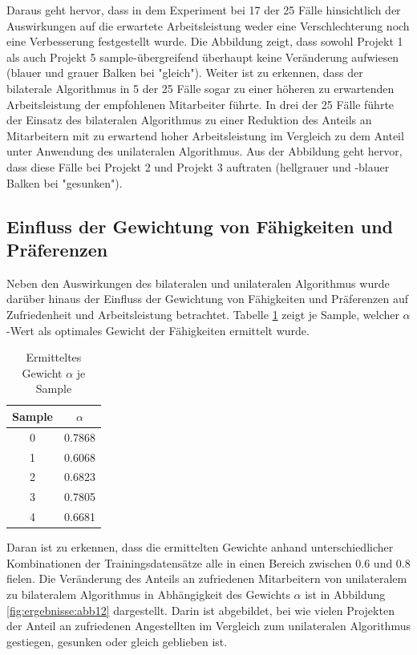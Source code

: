 Daraus geht hervor, dass in dem Experiment bei 17 der 25 Fälle hinsichtlich der Auswirkungen auf die erwartete Arbeitsleistung weder eine Verschlechterung noch eine Verbesserung festgestellt wurde.
Die Abbildung zeigt, dass sowohl Projekt 1 als auch Projekt 5 sample-übergreifend überhaupt keine Veränderung aufwiesen (blauer und grauer Balken bei "gleich").
Weiter ist zu erkennen, dass der bilaterale Algorithmus in 5 der 25 Fälle sogar zu einer höheren zu erwartenden Arbeitsleistung der empfohlenen Mitarbeiter führte. 
In drei der 25 Fälle führte der Einsatz des bilateralen Algorithmus zu einer Reduktion des Anteils an Mitarbeitern mit zu erwartend hoher Arbeitsleistung im Vergleich zu dem Anteil unter Anwendung des unilateralen Algorithmus.
Aus der Abbildung geht hervor, dass diese Fälle bei Projekt 2 und Projekt 3 auftraten (hellgrauer und -blauer Balken bei "gesunken").

\subsection{Einfluss der Gewichtung von Fähigkeiten und Präferenzen}
Neben den Auswirkungen des bilateralen und unilateralen Algorithmus wurde darüber hinaus der Einfluss der Gewichtung von Fähigkeiten und Präferenzen auf Zufriedenheit und Arbeitsleistung betrachtet.
Tabelle \ref{tab:ergebnisse:tab1} zeigt je Sample, welcher $\alpha$-Wert als optimales Gewicht der Fähigkeiten ermittelt wurde.

\begin{table}[htbp]
    \begin{center}
    \begin{tabular}{c|c}
    {\textbf{Sample}} & {\boldmath$\alpha$}\\
    \hline
    0 & 0.7868 \\
    \hline
	1 & 0.6068 \\
    \hline
    2 & 0.6823 \\
    \hline
	3 & 0.7805 \\
    \hline
	4 & 0.6681 \\
    \end{tabular}
    \end{center}
    \caption[Ermitteltes Gewicht $\alpha$ je Sample]{Ermitteltes Gewicht $\alpha$ je Sample}
	\label{tab:ergebnisse:tab1}
\end{table}

Daran ist zu erkennen, dass die ermittelten Gewichte anhand unterschiedlicher Kombinationen der Trainingsdatensätze alle in einen Bereich zwischen 0.6 und 0.8 fielen.
Die Veränderung des Anteils an zufriedenen Mitarbeitern von unilateralem zu bilateralem Algorithmus in Abhängigkeit des Gewichts $\alpha$ ist in Abbildung \ref{fig:ergebnisse:abb12} dargestellt.
Darin ist abgebildet, bei wie vielen Projekten der Anteil an zufriedenen Angestellten im Vergleich zum unilateralen Algorithmus gestiegen, gesunken oder gleich geblieben ist.

